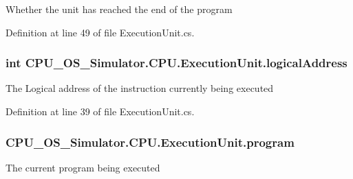 Whether the unit has reached the end of the program 



Definition at line 49 of file Execution\+Unit.\+cs.

\hypertarget{class_c_p_u___o_s___simulator_1_1_c_p_u_1_1_execution_unit_aa387f2bbbf0de1c75cbd1c79e27a630c}{}
\subsubsection[{logical\+Address}]{\setlength{\rightskip}{0pt plus 5cm}int C\+P\+U\+\_\+\+O\+S\+\_\+\+Simulator.\+C\+P\+U.\+Execution\+Unit.\+logical\+Address\hspace{0.3cm}{\ttfamily [private]}}\label{class_c_p_u___o_s___simulator_1_1_c_p_u_1_1_execution_unit_aa387f2bbbf0de1c75cbd1c79e27a630c}


The Logical address of the instruction currently being executed 



Definition at line 39 of file Execution\+Unit.\+cs.

\hypertarget{class_c_p_u___o_s___simulator_1_1_c_p_u_1_1_execution_unit_a192670bee8ca089c38e9989350f658d6}{}
\subsubsection[{program}]{ C\+P\+U\+\_\+\+O\+S\+\_\+\+Simulator.\+C\+P\+U.\+Execution\+Unit.\+program\hspace{0.3cm}{\ttfamily [protected]}}\label{class_c_p_u___o_s___simulator_1_1_c_p_u_1_1_execution_unit_a192670bee8ca089c38e9989350f658d6}


The current program being executed 



